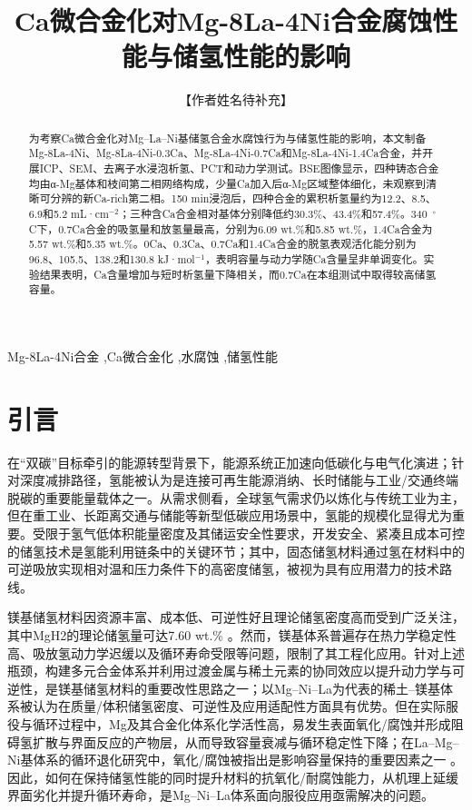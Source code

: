 \documentclass[preprint,12pt]{elsarticle}
\begin{document}
\begin{frontmatter}
\title{Ca微合金化对Mg-8La-4Ni合金腐蚀性能与储氢性能的影响}
\author[aff1]{【作者姓名待补充】}
\begin{abstract}
为考察Ca微合金化对Mg--La--Ni基储氢合金水腐蚀行为与储氢性能的影响，本文制备Mg-8La-4Ni、Mg-8La-4Ni-0.3Ca、Mg-8La-4Ni-0.7Ca和Mg-8La-4Ni-1.4Ca合金，并开展ICP、SEM、去离子水浸泡析氢、PCT和动力学测试。BSE图像显示，四种铸态合金均由α-Mg基体和枝间第二相网络构成，少量Ca加入后α-Mg区域整体细化，未观察到清晰可分辨的新Ca-rich第二相。150 min浸泡后，四种合金的累积析氢量约为12.2、8.5、6.9和5.2 mL·cm$^{-2}$；三种含Ca合金相对基体分别降低约30.3\%、43.4\%和57.4\%。340~$^{\circ}$C下，0.7Ca合金的吸氢量和放氢量最高，分别为6.09 wt.\%和5.85 wt.\%，1.4Ca合金为5.57 wt.\%和5.35 wt.\%。0Ca、0.3Ca、0.7Ca和1.4Ca合金的脱氢表观活化能分别为96.8、105.5、138.2和130.8 kJ·mol$^{-1}$，表明容量与动力学随Ca含量呈非单调变化。实验结果表明，Ca含量增加与短时析氢量下降相关，而0.7Ca在本组测试中取得较高储氢容量。
\end{abstract}
\begin{keyword}Mg-8La-4Ni合金 \sep Ca微合金化 \sep 水腐蚀 \sep 储氢性能\end{keyword}
\end{frontmatter}
\fontsize{10.5}{18}\selectfont
\section{引言}

在“双碳”目标牵引的能源转型背景下，能源系统正加速向低碳化与电气化演进；针对深度减排路径，氢能被认为是连接可再生能源消纳、长时储能与工业/交通终端脱碳的重要能量载体之一\cite{ref1}。从需求侧看，全球氢气需求仍以炼化与传统工业为主，但在重工业、长距离交通与储能等新型低碳应用场景中，氢能的规模化显得尤为重要\cite{ref2}。受限于氢气低体积能量密度及其储运安全性要求，开发安全、紧凑且成本可控的储氢技术是氢能利用链条中的关键环节；其中，固态储氢材料通过氢在材料中的可逆吸放实现相对温和压力条件下的高密度储氢，被视为具有应用潜力的技术路线\cite{ref3}。

镁基储氢材料因资源丰富、成本低、可逆性好且理论储氢密度高而受到广泛关注，其中MgH2的理论储氢量可达7.60 wt.\% \cite{ref3}。然而，镁基体系普遍存在热力学稳定性高、吸放氢动力学迟缓以及循环寿命受限等问题，限制了其工程化应用。针对上述瓶颈，构建多元合金体系并利用过渡金属与稀土元素的协同效应以提升动力学与可逆性，是镁基储氢材料的重要改性思路之一；以Mg–Ni–La为代表的稀土–镁基体系被认为在质量/体积储氢密度、可逆性及应用适配性方面具有优势\cite{ref4}。但在实际服役与循环过程中，Mg及其合金化体系化学活性高，易发生表面氧化/腐蚀并形成阻碍氢扩散与界面反应的产物层，从而导致容量衰减与循环稳定性下降；在La–Mg–Ni基体系的循环退化研究中，氧化/腐蚀被指出是影响容量保持的重要因素之一\cite{ref5} 。因此，如何在保持储氢性能的同时提升材料的抗氧化/耐腐蚀能力，从机理上延缓界面劣化并提升循环寿命，是Mg–Ni–La体系面向服役应用亟需解决的问题。
\end{document}
